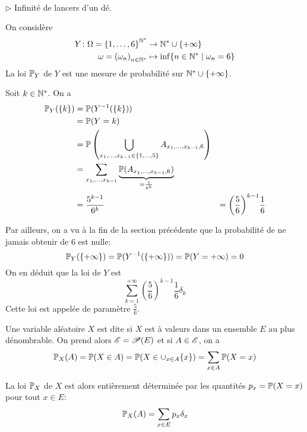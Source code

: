 \begin{exs}[]\,\\
    \(\triangleright\) Infinité de lancers d'un dé.

    On considère
    \begin{equation*}
        \begin{aligned}
            Y\colon \Omega={\{1,\dots,6\}}^{\mathbb{N}^\ast}&\to \mathbb{N}^\ast\cup\{+\infty\}\\
            \omega={{(\omega_n)}_{n\in\mathbb{N}^\ast}}&\mapsto \inf\{n\in\mathbb{N}^\ast\mid \omega_n = 6\}
        \end{aligned}
    \end{equation*}
    La loi \(\mathbb{P}_Y\) de \(Y\) est une mesure de probabilité sur \(\mathbb{N}^\ast\cup\{+\infty\}\).

    Soit \(k\in\mathbb{N}^\ast\). On a
    \begin{equation*}
        \begin{aligned}
            \mathbb{P}_Y(\{k\}) 
            &= \mathbb{P}(Y^{-1}(\{k\}))\\
            &= \mathbb{P}(Y=k)\\
            &= \mathbb{P}\left(\bigcup_{x_1,\dots,x_{k-1}\in\{1,\dots,5\}}A_{x_1,\dots,x_{k-1},6}\right)\\
            &= \sum_{x_1,\dots,x_{k-1}} \underbrace{\mathbb{P}(A_{x_1,\dots,x_{k-1},6})}_{=\frac{1}{6^k}}\\
            &= \frac{5^{k-1}}{6^k}
            &= {\left(\frac{5}{6}\right)}^{k-1}\frac{1}{6}
        \end{aligned}
    \end{equation*}

    Par ailleurs, on a vu à la fin de la section précédente que
    la probabilité de ne jamais obtenir de 6 est nulle:
    \begin{equation*}
        \mathbb{P}_Y(\{+\infty\}) = \mathbb{P}(Y^{-1}(\{+\infty\})) = \mathbb{P}(Y=+\infty) = 0
    \end{equation*}
    On en déduit que la loi de \(Y\) est 
    \begin{equation*}
        \sum_{k=1}^{+\infty} {\left(\frac{5}{6}\right)}^{k-1}\frac{1}{6}\delta_k
    \end{equation*}
    Cette loi est appelée  de paramètre \(\frac{5}{6}\).
\end{exs}

\begin{definition}
    Une variable aléatoire \(X\) est dite  si \(X\) est à valeurs dans un ensemble \(E\) au plus dénombrable.
    On prend alors \(\mathscr{E} = \mathscr{P}(E)\) et si \(A\in\mathscr{E}\), on a
    \begin{equation*}
        \mathbb{P}_X(A) = \mathbb{P}(X\in A) = \mathbb{P}(X\in\cup_{x\in A}\{x\}) = \sum_{x\in A}\mathbb{P}(X=x)
    \end{equation*}

    La loi \(\mathbb{P}_X\) de \(X\) est alors entièrement déterminée par les quantités \(p_x = \mathbb{P}(X=x)\) pour tout \(x\in E\):
    \begin{equation*}
        \mathbb{P}_X(A) = \sum_{x\in E}p_x\delta_x
    \end{equation*}
\end{definition}

